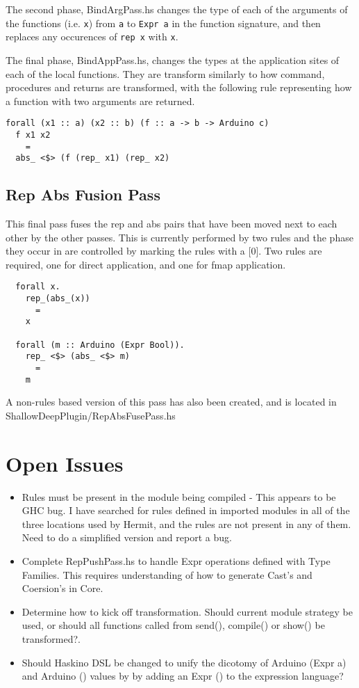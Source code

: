 \documentclass[11pt, oneside]{article}   	%
\begin{document}
The second phase, BindArgPass.hs changes the type of each of the
arguments of the functions (i.e.  \verb+x+) from \verb+a+ to  \verb+Expr a+
in the function signature, and then replaces any occurences of  \verb+rep x+ 
with \verb+x+.

The final phase, BindAppPass.hs, changes the types at the application
sites of each of the local functions.  They are transform similarly to
how command, procedures and returns are transformed, with the
following rule representing how a function with two arguments are
returned.

\begin{verbatim}
forall (x1 :: a) (x2 :: b) (f :: a -> b -> Arduino c)
  f x1 x2  
    =  
  abs_ <$> (f (rep_ x1) (rep_ x2)
\end{verbatim}

\subsection{Rep Abs Fusion Pass}

This final pass fuses the rep and abs pairs that have been moved next
to each other by the other passes.  This is currently performed by
two rules and the phase they occur in are controlled by marking the rules
with a [0].  Two rules are required, one for direct application, and one for
fmap application.

\begin{verbatim}
  forall x.
    rep_(abs_(x))
      =
    x

  forall (m :: Arduino (Expr Bool)).
    rep_ <$> (abs_ <$> m)
      =
    m
\end{verbatim}

A non-rules based version of this pass has also been created, and is
located in ShallowDeepPlugin/RepAbsFusePass.hs

\section{Open Issues}

\begin{itemize}
  \item Rules must be present in the module being compiled - This appears to be 
  GHC bug.  I have searched for rules defined in imported modules in all of the
  three locations used by Hermit, and the rules are not present in any of them. 
  Need to do a simplified version and report a bug.
  \item Complete RepPushPass.hs to handle Expr operations defined with
  Type Families.  This requires understanding of how to generate Cast's and
  Coersion's in Core.
  \item Determine how to kick off transformation.  Should current module 
  strategy be used, or should all functions called from send(), compile() or
  show() be transformed?.
  \item Should Haskino DSL be changed to unify the dicotomy of Arduino (Expr a)
  and Arduino () values by by adding an Expr () to the expression language?
\end{itemize}
\end{document}

